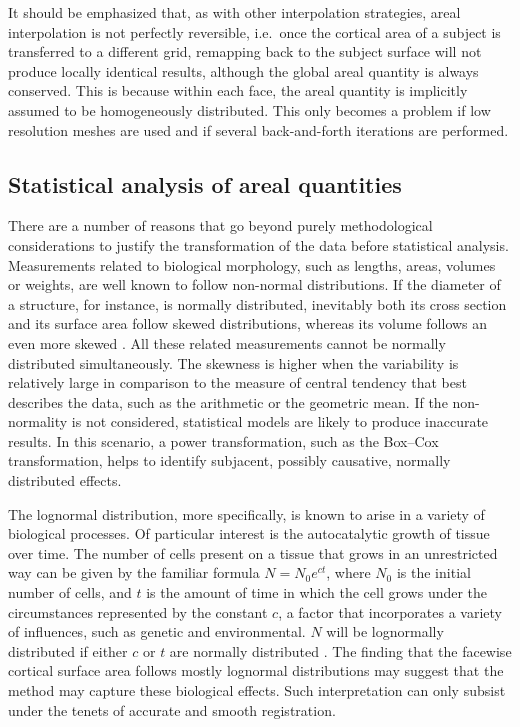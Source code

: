 It should be emphasized that, as with other interpolation strategies, areal interpolation is not perfectly reversible, i.e.\ once the cortical area of a subject is transferred to a different grid, remapping back to the subject surface will not produce locally identical results, although the global areal quantity is always conserved. This is because within each face, the areal quantity is implicitly assumed to be homogeneously distributed. This only becomes a problem if low resolution meshes are used and if several back-and-forth iterations are performed.

\subsection{Statistical analysis of areal quantities}

There are a number of reasons that go beyond purely methodological considerations to justify the transformation of the data before statistical analysis. Measurements related to biological morphology, such as lengths, areas, volumes or weights, are well known to follow non-normal distributions. If the diameter of a structure, for instance, is normally distributed, inevitably both its cross section and its surface area follow skewed distributions, whereas its volume follows an even more skewed \citep{Kapteyn1916, Gaddum1945}. All these related measurements cannot be normally distributed simultaneously. The skewness is higher when the variability is relatively large in comparison to the measure of central tendency that best describes the data, such as the arithmetic or the geometric mean. If the non-normality is not considered, statistical models are likely to produce inaccurate results. In this scenario, a power transformation, such as the Box--Cox transformation, helps to identify subjacent, possibly causative, normally distributed effects.

The lognormal distribution, more specifically, is known to arise in a variety of biological processes. Of particular interest is the autocatalytic growth of tissue over time. The number of cells present on a tissue that grows in an unrestricted way can be given by the familiar formula $N=N_0e^{ct}$, where $N_0$ is the initial number of cells, and $t$ is the amount of time in which the cell grows under the circumstances represented by the constant $c$, a factor that incorporates a variety of influences, such as genetic and environmental. $N$ will be lognormally distributed if either $c$ or $t$ are normally distributed \citep{Koch1966, Limpert2001}. The finding that the facewise cortical surface area follows mostly lognormal distributions may suggest that the method may capture these biological effects. Such interpretation can only subsist under the tenets of accurate and smooth registration.

